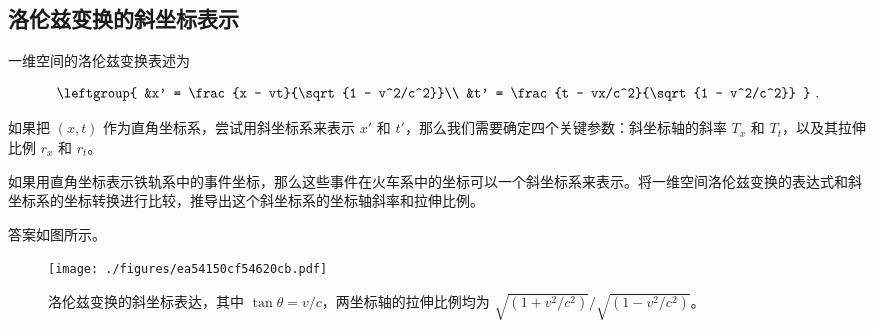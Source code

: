 
\subsection{洛伦兹变换的斜坐标表示}

一维空间的洛伦兹变换表述为

\begin{equation}\label{eq_SROb_1}
\leftgroup{
&x' = \frac{x - vt}{\sqrt{1 - v^2/c^2}}\\
&t' = \frac{t - vx/c^2}{\sqrt{1 - v^2/c^2}}
}~.
\end{equation}

如果把 $(x,t)$ 作为直角坐标系，尝试用斜坐标系来表示 $x'$ 和 $t'$，那么我们需要确定四个关键参数：斜坐标轴的斜率 $T_x$ 和 $T_t$，以及其拉伸比例 $r_x$ 和 $r_t$。

\begin{exercise}{}

如果用直角坐标表示铁轨系中的事件坐标，那么这些事件在火车系中的坐标可以一个斜坐标系来表示。将一维空间洛伦兹变换的表达式和斜坐标系的坐标转换进行比较，推导出这个斜坐标系的坐标轴斜率和拉伸比例。

\end{exercise}

答案如图所示。

\begin{figure}[ht]
\centering
\texttt{[image: ./figures/ea54150cf54620cb.pdf]}
\caption{洛伦兹变换的斜坐标表达，其中 $\tan{\theta}=v/c$，两坐标轴的拉伸比例均为 $\sqrt{(1+v^2/c^2)}/\sqrt{(1-v^2/c^2)}$。} \label{fig_SROb_1}
\end{figure}




